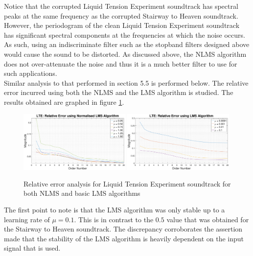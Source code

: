 \documentclass{article}
\begin{document}
Notice that the corrupted Liquid Tension Experiment soundtrack has spectral peaks at the same frequency as the corrupted Stairway to Heaven soundtrack. However, the periodogram of the clean Liquid Tension Experiment soundtrack has significant spectral components at the frequencies at which the noise occurs. As such, using an indiscriminate filter such as the stopband filters designed above would cause the sound to be distorted. As discussed above, the NLMS algorithm does not over-attenuate the noise and thus it is a much better filter to use for such applications.\\


Similar analysis to that performed in section 5.5 is performed below. The relative error incurred using both the NLMS and the LMS algorithm is studied. The results obtained are graphed in figure \ref{fig:relative_error_lte}.

\begin{figure}[H]
    \centering
    \includegraphics[width=0.49\textwidth]{lte_nlms_relative_error}
    \includegraphics[width=0.49\textwidth]{lte_lms_relative_error}
    \caption{Relative error analysis for Liquid Tension Experiment soundtrack for both NLMS and basic LMS algorithms}
    \label{fig:relative_error_lte}
\end{figure}

The first point to note is that the LMS algorithm was only stable up to a learning rate of $\mu = 0.1$. This is in contrast to the $0.5$ value that was obtained for the Stairway to Heaven soundtrack. The discrepancy corroborates the assertion made that the stability of the LMS algorithm is heavily dependent on the input signal that is used.\\
\end{document}
